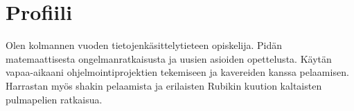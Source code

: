 \section*{Profiili}

Olen kolmannen vuoden tietojenkäsittelytieteen opiskelija. Pidän
matemaattisesta ongelmanratkaisusta ja uusien asioiden opettelusta. Käytän
vapaa-aikaani ohjelmointiprojektien tekemiseen ja kavereiden kanssa pelaamisen.
Harrastan myös shakin pelaamista ja erilaisten Rubikin kuution kaltaisten pulmapelien ratkaisua.
